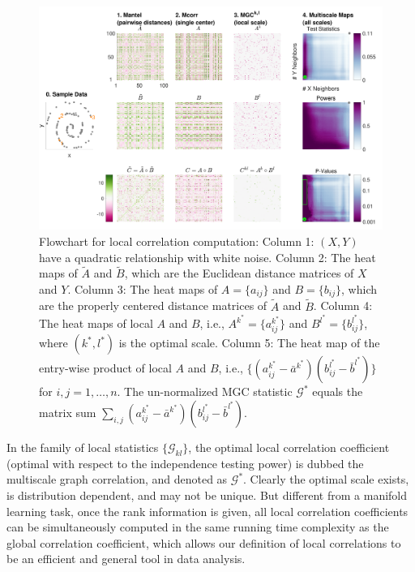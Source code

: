 \documentclass[11pt]{article}
\newcommand{\G}{\mathcal{G}}
\begin{document}
\begin{figure}[htbp]
\includegraphics[width=1.0\textwidth]{Figures/FigA}
\caption{
Flowchart for local correlation computation: Column 1: $(X,Y)$ have a quadratic relationship with white noise. Column 2: The heat maps of $\tilde{A}$ and $\tilde{B}$, which are the Euclidean distance matrices of $X$ and $Y$. Column 3: The heat maps of $A=\{a_{ij}\}$ and $B=\{b_{ij}\}$, which are the properly centered distance matrices of $\tilde{A}$ and $\tilde{B}$. Column 4: The heat maps of local $A$ and $B$, i.e., $A^{k^{*}}=\{a^{k^{*}}_{ij}\}$ and $B^{l^{*}}=\{b^{l^{*}}_{ij}\}$, where $(k^{*},l^{*})$ is the optimal scale. Column 5: The heat map of the entry-wise product of local $A$ and $B$, i.e., $\{(a_{ij}^{k^{*}}-\bar{a}^{k^{*}}) (b_{ij}^{l^{*}}-\bar{b}^{l^{*}})\}$ for $i,j=1,\ldots,n$. The un-normalized MGC statistic $\G^{*}$ equals the matrix sum $\sum_{i,j}(a_{ij}^{k^{*}}-\bar{a}^{k^{*}}) (b_{ij}^{l^{*}}-\bar{b}^{l^{*}})$. }
\label{fig:A}
\end{figure}

In the family of local statistics $\{\G_{kl}\}$, the optimal local correlation coefficient (optimal with respect to the independence testing power) is dubbed the multiscale graph correlation, and denoted as $\G^{*}$. Clearly the optimal scale exists, is distribution dependent, and may not be unique. But different from a manifold learning task, once the rank information is given, all local correlation coefficients can be simultaneously computed in the same running time complexity as the global correlation coefficient, which allows our definition of local correlations to be an efficient and general tool in data analysis.
\end{document}
